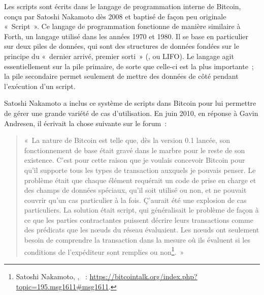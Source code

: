 Les scripts sont écrits dans le langage de programmation interne de Bitcoin, conçu par Satoshi Nakamoto dès 2008 et baptisé de façon peu originale «~Script~». Ce langage de programmation fonctionne de manière similaire à Forth, un langage utilisé dans les années 1970 et 1980. Il se base en particulier sur deux piles de données, qui sont des structures de données fondées sur le principe du «~dernier arrivé, premier sorti~» (, ou LIFO). Le langage agit essentiellement sur la pile primaire, de sorte que celle-ci est la plus importante~; la pile secondaire permet seulement de mettre des données de côté pendant l'exécution d'un script.

Satoshi Nakamoto a inclus ce système de scripts dans Bitcoin pour lui permettre de gérer une grande variété de cas d'utilisation. En juin 2010, en réponse à Gavin Andresen, il écrivait la chose suivante sur le forum~:

\begin{quote}
«~La nature de Bitcoin est telle que, dès la version 0.1 lancée, son fonctionnement de base était gravé dans le marbre pour le reste de son existence. C'est pour cette raison que je voulais concevoir Bitcoin pour qu'il supporte tous les types de transaction auxquels je pouvais penser. Le problème était que chaque élément requérait un code de prise en charge et des champs de données spéciaux, qu'il soit utilisé ou non, et ne pouvait couvrir qu'un cas particulier à la fois. Ç'aurait été une explosion de cas particuliers. La solution était script, qui généralisait le problème de façon à ce que les parties contractantes puissent décrire leurs transactions comme des prédicats que les nœuds du réseau évaluaient. Les nœuds ont seulement besoin de comprendre la transaction dans la mesure où ils évaluent si les conditions de l'expéditeur sont remplies ou non\footnote{Satoshi Nakamoto, , ~: \url{https://bitcointalk.org/index.php?topic=195.msg1611\#msg1611}.}.~»
\end{quote} %

